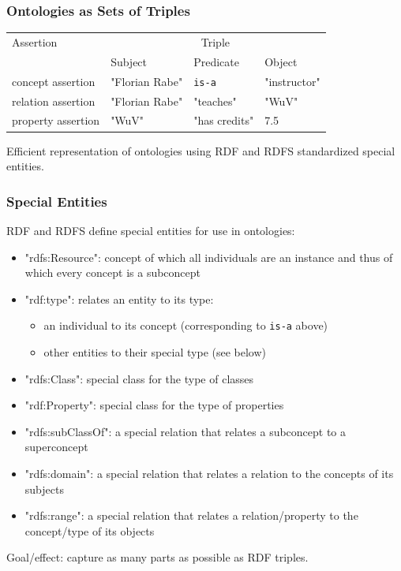 \documentclass{beamer}
\begin{document}
\begin{frame}\frametitle{Ontologies as Sets of Triples}
\begin{center}
\begin{tabular}{l|lll}
Assertion & \multicolumn{3}{c}{Triple} \\
          & Subject & Predicate & Object \\
\hline
concept assertion  & "Florian Rabe" & \texttt{is-a} & "instructor" \\
relation assertion & "Florian Rabe" & "teaches" & "WuV" \\
property assertion & "WuV" & "has credits" & 7.5 \\
\end{tabular}
\medskip

Efficient representation of ontologies using RDF and RDFS standardized special entities.
\end{center}
\end{frame}

\begin{frame}\frametitle{Special Entities}
RDF and RDFS define special entities for use in ontologies:
\begin{itemize}
 \item "rdfs:Resource": concept of which all individuals are an instance and thus of which every concept is a subconcept
 \item "rdf:type": relates an entity to its type:
  \begin{itemize}
   \item an individual to its concept (corresponding to \texttt{is-a} above)
   \item other entities to their special type (see below)
  \end{itemize}
 \item "rdfs:Class": special class for the type of classes
 \item "rdf:Property": special class for the type of properties
 \item "rdfs:subClassOf": a special relation that relates a subconcept to a superconcept
 \item "rdfs:domain": a special relation that relates a relation to the concepts of its subjects
 \item "rdfs:range": a special relation that relates a relation/property to the concept/type of its objects
\end{itemize}

Goal/effect: capture as many parts as possible as RDF triples.
\end{frame}
\end{document}
